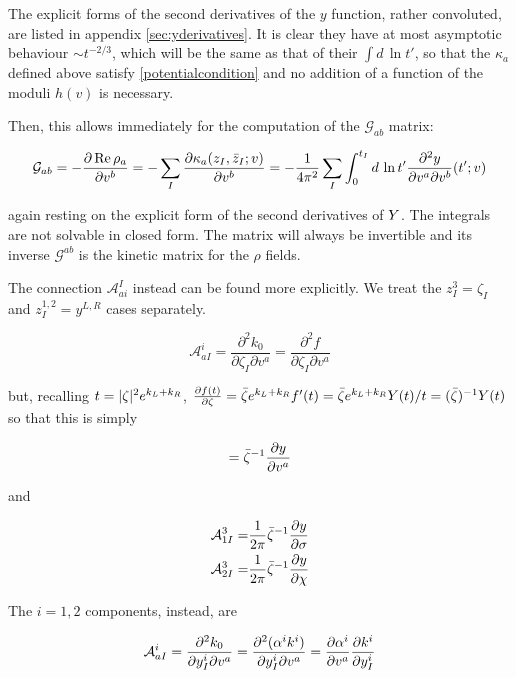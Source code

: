 The explicit forms of the second derivatives of the $y$ function, rather convoluted, are listed in appendix \ref{sec:yderivatives}. It is clear they have at most asymptotic behaviour $\sim t^{-2/3}$, which will be the same as that of their $\int d\,\ln t'$, so that the $\kappa_a$ defined above satisfy \eqref{potentialcondition} and no addition of a function of the moduli $h(v)$ is necessary.

Then, this allows immediately for the computation of the $\mathcal{G}_{ab}$ matrix:

\begin{equation}
	\mathcal{G}_{ab} = - \frac{\partial\operatorname{Re} \rho_a}{\partial v^b}  = - \sum_I \frac{\partial \kappa_a(z_I,\bar z_I; v)}{\partial v^b} = - \frac{1}{4\pi^2} \sum_I \int_0^{t_I} d\,\ln t' \frac{\partial^2 y}{\partial v^a \partial v^b} (t' ; v)
	\label{Gfinal}
\end{equation}

again resting on the explicit form of the second derivatives of $Y$. The integrals are not solvable in closed form. The matrix will always be invertible and its inverse $\mathcal{G}^{ab}$ is the kinetic matrix for the $\rho$ fields.

The connection $\mathcal{A}_{ai}^I$ instead can be found more explicitly. We treat the $z_I^3 = \zeta_I$ and $z_I^{1,2} = y^{L,R}$ cases separately.

\begin{equation}
	\mathcal{A}_{aI}^i = \frac{\partial^2 k_0}{\partial \zeta_I \partial v^a} = \frac{\partial^2 f}{\partial \zeta_I \partial v^a}
	\label{}
\end{equation}

but, recalling $t = |\zeta|^2 e^{k_L + k_R}$, $\frac{\partial f(t)}{\partial\zeta} = \bar \zeta e^{k_L + k_R} f'(t) =\bar \zeta e^{k_L + k_R} Y(t)/t = (\bar \zeta)^{-1} Y(t)$ so that this is simply

\begin{equation}
	= \bar \zeta^{-1} \frac{\partial y}{\partial v^a}	\label{}
\end{equation}

and

\begin{align}
	\mathcal{A}_{1I}^3 =& \frac{1}{2\pi} \bar \zeta^{-1} \frac{\partial y}{\partial\sigma}\\
	\mathcal{A}_{2I}^3 =& \frac{1}{2\pi} \bar \zeta^{-1} \frac{\partial y}{\partial\chi}
	\label{Afinal3}
\end{align}

The $i=1,2$ components, instead, are

\begin{equation}
	\mathcal{A}_{aI}^i = \frac{\partial^2 k_0}{\partial y_I^i \partial v^a} = \frac{\partial^2 (\alpha^i k^i)}{\partial y_I^i \partial v^a}  = \frac{\partial\alpha^i}{\partial v^a} \frac{\partial k^i}{\partial y_I^i}
	\label{Afinal12}
\end{equation}

